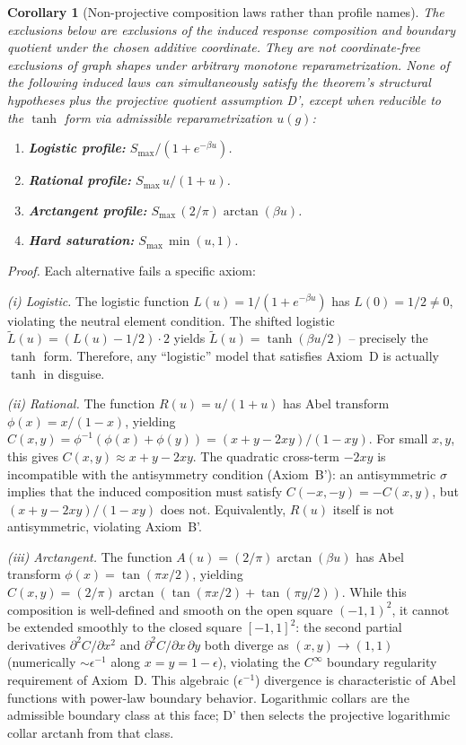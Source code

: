 \documentclass[aps,prd,twocolumn,superscriptaddress,nofootinbib]{revtex4-2}
\newtheorem{corollary}{Corollary}
\begin{document}
\begin{corollary}[Non-projective composition laws rather than profile names]
\label{cor:exclusion}
The exclusions below are exclusions of the induced response composition and boundary quotient under the chosen additive coordinate. They are not coordinate-free exclusions of graph shapes under arbitrary monotone reparametrization. None of the following induced laws can simultaneously satisfy the theorem's structural hypotheses plus the projective quotient assumption D', except when reducible to the $\tanh$ form via admissible reparametrization $u(g)$:
\begin{enumerate}
\item[(i)] \textbf{Logistic profile:} $S_{\max}/(1 + e^{-\beta u})$.
\item[(ii)] \textbf{Rational profile:} $S_{\max}\,u/(1 + u)$.
\item[(iii)] \textbf{Arctangent profile:} $S_{\max}\,(2/\pi)\arctan(\beta u)$.
\item[(iv)] \textbf{Hard saturation:} $S_{\max}\,\min(u, 1)$.
\end{enumerate}
\end{corollary}

\textit{Proof.} Each alternative fails a specific axiom:

\textit{(i) Logistic.} The logistic function $L(u) = 1/(1 + e^{-\beta u})$ has $L(0) = 1/2 \neq 0$, violating the neutral element condition. The shifted logistic $\tilde{L}(u) = (L(u) - 1/2) \cdot 2$ yields $\tilde{L}(u) = \tanh(\beta u/2)$ -- precisely the $\tanh$ form. Therefore, any ``logistic'' model that satisfies Axiom~D is actually $\tanh$ in disguise.

\textit{(ii) Rational.} The function $R(u) = u/(1+u)$ has Abel transform $\phi(x) = x/(1-x)$, yielding $C(x,y) = \phi^{-1}(\phi(x) + \phi(y)) = (x + y - 2xy)/(1 - xy)$. For small $x, y$, this gives $C(x,y) \approx x + y - 2xy$. The quadratic cross-term $-2xy$ is incompatible with the antisymmetry condition (Axiom~B'): an antisymmetric $\sigma$ implies that the induced composition must satisfy $C(-x,-y) = -C(x,y)$, but $(x+y-2xy)/(1-xy)$ does not. Equivalently, $R(u)$ itself is not antisymmetric, violating Axiom~B'.

\textit{(iii) Arctangent.} The function $A(u) = (2/\pi)\arctan(\beta u)$ has Abel transform $\phi(x) = \tan(\pi x/2)$, yielding $C(x,y) = (2/\pi)\arctan(\tan(\pi x/2) + \tan(\pi y/2))$. While this composition is well-defined and smooth on the open square $(-1,1)^2$, it cannot be extended smoothly to the closed square $[-1,1]^2$: the second partial derivatives $\partial^2 C/\partial x^2$ and $\partial^2 C/\partial x\,\partial y$ both diverge as $(x,y) \to (1,1)$ (numerically $\sim \epsilon^{-1}$ along $x = y = 1 - \epsilon$), violating the $C^\infty$ boundary regularity requirement of Axiom~D. This algebraic ($\epsilon^{-1}$) divergence is characteristic of Abel functions with power-law boundary behavior. Logarithmic collars are the admissible boundary class at this face; D' then selects the projective logarithmic collar $\mathrm{arctanh}$ from that class.
\end{document}
